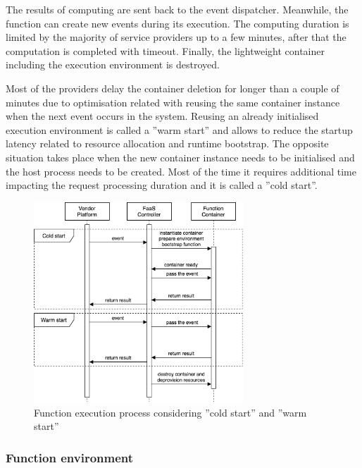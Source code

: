The results of computing are sent back to the event dispatcher. Meanwhile, the function can create new events during its execution. The computing duration is limited by the majority of service providers up to a few minutes, after that the computation is completed with timeout. Finally, the lightweight container including the execution environment is destroyed.

Most of the providers delay the container deletion for longer than a couple of minutes due to optimisation related with reusing the same container instance when the next event occurs in the system. Reusing an already initialised execution environment is called a ''warm start'' and allows to reduce the startup latency related to resource allocation and runtime bootstrap. The opposite situation takes place when the new container instance needs to be initialised and the host process needs to be created. Most of the time it requires additional time impacting the request processing duration and it is called a ''cold start''.

\begin{figure}[h]
    \centering
    \includegraphics[width=0.7\textwidth]{assets/02-serverless/ServerlessExecution.png}
    \caption{Function execution process considering ''cold start'' and ''warm start''}
    \label{fig:function-execution-process}
\end{figure}


\subsubsection{Function environment} \label{section:serverless-function-environment}

